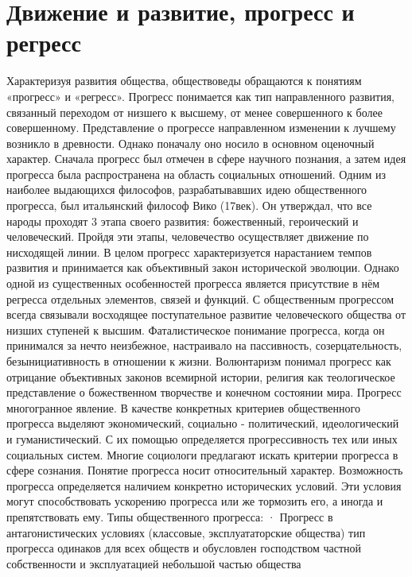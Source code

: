 \documentclass[12pt]{article}
\begin{document}
\newpage
\section{Движение и развитие, прогресс и регресс}
Характеризуя  развития общества, обществоведы обращаются к понятиям «прогресс» и «регресс». Прогресс
понимается  как  тип  направленного  развития,  связанный  переходом  от  низшего  к  высшему,   от  менее
совершенного  к  более  совершенному.  Представление  о  прогрессе   направленном   изменении  к  лучшему
возникло в древности. Однако поначалу оно носило в основном оценочный характер. Сначала прогресс был
отмечен в сфере научного познания, а затем идея  прогресса была распространена на область социальных
отношений. Одним из наиболее выдающихся  философов, разрабатывавших идею общественного прогресса,
был итальянский философ  Вико (17век). Он утверждал, что все народы проходят 3 этапа своего развития:
божественный,  героический и человеческий. Пройдя эти этапы, человечество осуществляет движение  по
нисходящей  линии.  В  целом  прогресс  характеризуется  нарастанием  темпов  развития   и  принимается  как
объективный закон исторической эволюции. Однако одной из существенных особенностей прогресса является
присутствие в нём регресса отдельных элементов, связей  и функций. С общественным прогрессом всегда
связывали  восходящее  поступательное  развитие   человеческого  общества  от  низших  ступеней  к  высшим.
Фаталистическое  понимание  прогресса,   когда  он  принимался  за  нечто  неизбежное,  настраивало  на
пассивность, созерцательность, безынициативность в отношении к жизни. Волюнтаризм понимал прогресс как
отрицание   объективных  законов  всемирной  истории,  религия   как  теологическое  представление  о
божественном  творчестве  и  конечном  состоянии  мира.  Прогресс   многогранное  явление.   В  качестве
конкретных  критериев  общественного  прогресса  выделяют  экономический,  социально   -  политический,
идеологический и гуманистический. С их помощью определяется прогрессивность тех или иных социальных  
систем. Многие социологи предлагают искать критерии прогресса в сфере сознания. Понятие прогресса носит
относительный характер. Возможность прогресса  определяется наличием конкретно  исторических условий.
Эти условия могут способствовать ускорению прогресса или же тормозить его, а иногда и препятствовать ему.
Типы общественного прогресса:
· Прогресс в антагонистических условиях (классовые, эксплуататорские общества) тип прогресса одинаков для
всех обществ и обусловлен господством частной собственности и эксплуатацией небольшой частью общества
\end{document}

